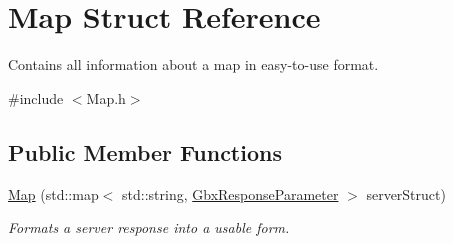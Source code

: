 \hypertarget{structMap}{\section{Map Struct Reference}
\label{structMap}
}


Contains all information about a map in easy-\/to-\/use format.  




{\ttfamily \#include $<$Map.\-h$>$}

\subsection*{Public Member Functions}
\begin{DoxyCompactItemize}
\item 
\hyperlink{structMap_a95a2cda9b2746b5ba75e811930559c1f}{Map} (std\-::map$<$ std\-::string, \hyperlink{classGbxResponseParameter}{Gbx\-Response\-Parameter} $>$ server\-Struct)
\begin{DoxyCompactList}\small\item\em Formats a server response into a usable form. \end{DoxyCompactList}\end{DoxyCompactItemize}
